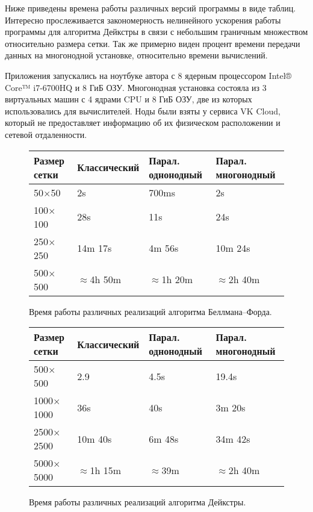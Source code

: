 Ниже приведены времена работы различных версий программы в виде таблиц.
Интересно прослеживается закономерность нелинейного ускорения работы программы для алгоритма Дейкстры в связи с небольшим граничным множеством относительно размера сетки. Так же примерно виден процент времени передачи данных на многонодной установке, относительно времени вычислений.

Приложения запускались на ноутбуке автора с 8 ядерным процессором Intel® Core™ i7-6700HQ и 8 ГиБ ОЗУ.
Многонодная установка состояла из 3 виртуальных машин с 4 ядрами CPU и 8 ГиБ ОЗУ, две из которых использовались для вычислителей. Ноды были взяты у сервиса VK Cloud, который не предоставляет информацию об их физическом расположении и сетевой отдаленности.

\begin{figure}[h]
    \centering
    \begin{tabular}{ | l | l | l | l |}
        \hline
        Размер сетки   & Классический    & Парал. однонодный & Парал. многонодный \\ \hline
        50$\times$50   & 2s              & 700ms             & 2s                 \\
        100$\times$100 & 28s             & 11s               & 24s                \\
        250$\times$250 & 14m 17s         & 4m 56s            & 10m 24s             \\
        500$\times$500 & $\approx$4h 50m & $\approx$1h 20m   & $\approx$2h 40m    \\
        \hline
    \end{tabular}
\caption{Время работы различных реализаций алгоритма Беллмана--Форда.}
\end{figure}

\begin{figure}[h]
    \centering
    \begin{tabular}{ | l | l | l | l |}
        \hline
        Размер сетки     & Классический    & Парал. однонодный & Парал. многонодный \\ \hline
        500$\times$500   & 2.9             & 4.5s              & 19.4s               \\
        1000$\times$1000 & 36s             & 40s               & 3m 20s             \\
        2500$\times$2500 & 10m 40s         & 6m 48s            & 34m 42s            \\
        5000$\times$5000 & $\approx$1h 15m & $\approx$39m      & $\approx$2h 40m    \\
        \hline
    \end{tabular}
    \caption{Время работы различных реализаций алгоритма Дейкстры.}
\end{figure}

